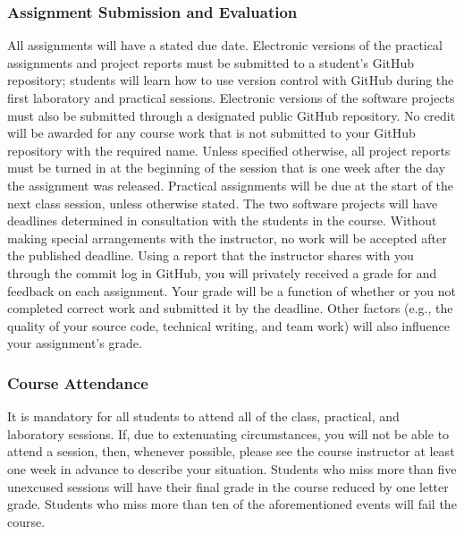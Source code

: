 \documentclass[11pt]{article}
\begin{document}
\subsubsection*{Assignment Submission and Evaluation}

All assignments will have a stated due date. Electronic versions of the
practical assignments and project reports must be submitted to a student's
GitHub repository; students will learn how to use version control with GitHub
during the first laboratory and practical sessions. Electronic versions of the
software projects must also be submitted through a designated public GitHub
repository. No credit will be awarded for any course work that is not submitted
to your GitHub repository with the required name.
%
Unless specified otherwise, all project reports must be turned in at the
beginning of the session that is one week after the day the assignment was
released. Practical assignments will be due at the start of the next class
session, unless otherwise stated. The two software projects will have deadlines
determined in consultation with the students in the course. Without making
special arrangements with the instructor, no work will be accepted after the
published deadline.
%
Using a report that the instructor shares with you through the commit log in
GitHub, you will privately received a grade for and feedback on each assignment.
Your grade will be a function of whether or you not completed correct work and
submitted it by the deadline. Other factors (e.g., the quality of your source
code, technical writing, and team work) will also influence your assignment's
grade.

\vspace*{-.1in}

\subsubsection*{Course Attendance}

It is mandatory for all students to attend all of the class, practical, and
laboratory sessions. If, due to extenuating circumstances, you will not be able
to attend a session, then, whenever possible, please see the course instructor
at least one week in advance to describe your situation. Students who miss more
than five unexcused sessions will have their final grade in the course reduced
by one letter grade. Students who miss more than ten of the aforementioned
events will fail the course.

\vspace*{-.05in}
\end{document}
